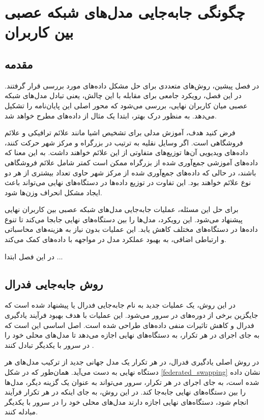 \chapter{چگونگی جابه‌جایی مدل‌های شبکه عصبی بین کاربران}

\section{مقدمه}
در فصل پیشین، روش‌های متعددی برای حل مشکل داده‌های
مورد بررسی قرار گرفتند. در این فصل، رویکرد جامعی برای مقابله با این چالش، یعنی تبادل مدل‌های شبکه عصبی میان کاربران نهایی، بررسی می‌شود که محور اصلی این پایان‌نامه را تشکیل می‌دهد. به منظور درک بهتر، ابتدا یک مثال از داده‌های
مطرح خواهد شد.

فرض کنید هدف، آموزش مدلی برای تشخیص اشیا مانند علائم ترافیکی و علائم فروشگاهی است. اگر وسایل نقلیه به ترتیب در بزرگراه و مرکز شهر حرکت کنند، داده‌های ویدیویی آن‌ها توزیع‌های متفاوتی از این علائم خواهند داشت. به این معنا که داده‌های آموزشی جمع‌آوری شده از بزرگراه ممکن است کمتر شامل علائم فروشگاهی باشند، در حالی که داده‌های جمع‌آوری شده از مرکز شهر حاوی تعداد بیشتری از هر دو نوع علائم خواهند بود. این تفاوت در توزیع داده‌ها در دستگاه‌های نهایی می‌تواند باعث ایجاد مشکل انحراف وزن‌ها شود.

برای حل این مسئله، عملیات جابه‌جایی مدل‌های شبکه عصبی بین کاربران نهایی پیشنهاد می‌شود. این رویکرد، مدل‌ها را بین دستگاه‌های نهایی جابجا می‌کند تا تنوع داده‌ها در دستگاه‌های مختلف کاهش یابد. این عملیات بدون نیاز به هزینه‌های محاسباتی و ارتباطی اضافی، به بهبود عملکرد مدل در مواجهه با داده‌های
کمک می‌کند.

در این فصل ابتدا ...

\section{
	روش جابه‌جایی فدرال%
}

در این روش، یک عملیات جدید به نام جابه‌جایی فدرال یا
پیشنهاد شده است که جایگزین برخی از دوره‌های
در سرور می‌شود. این عملیات با هدف بهبود فرآیند یادگیری فدرال و کاهش تاثیرات منفی داده‌های
طراحی شده است. اصل اساسی
این است که به جای اجرای
در هر تکرار، به دستگاه‌های نهایی اجازه می‌دهد تا مدل‌های محلی خود را در سرور با یکدیگر تبادل کنند
\cite{chiu2020semisupervised}.


در روش اصلی یادگیری فدرال، در هر تکرار یک مدل جهانی جدید از ترکیب مدل‌های هر دستگاه نهایی به دست می‌آید. همان‌طور که در شکل
\ref{federated_swapping}
نشان داده شده است، به جای اجرای
در هر تکرار، سرور می‌تواند به عنوان یک گزینه دیگر، مدل‌ها را بین دستگاه‌های نهایی جابه‌جا کند. در این روش، به جای اینکه در هر تکرار فرآیند
انجام شود، دستگاه‌های نهایی اجازه دارند مدل‌های محلی خود را در سرور با یکدیگر مبادله کنند.


